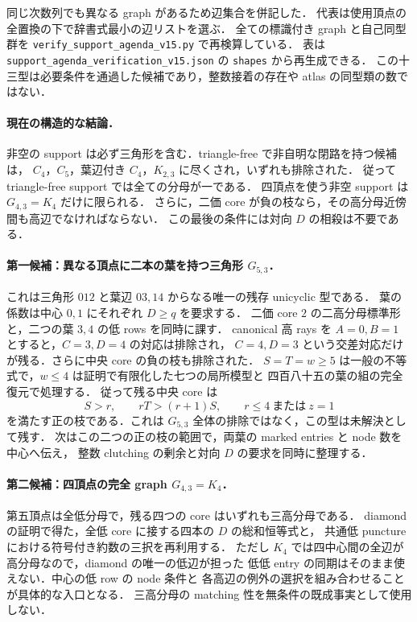 同じ次数列でも異なる graph があるため辺集合を併記した．
代表は使用頂点の全置換の下で辞書式最小の辺リストを選ぶ．
全ての標識付き graph と自己同型群を
\nolinkurl{verify_support_agenda_v15.py} で再検算している．
表は \nolinkurl{support_agenda_verification_v15.json} の \texttt{shapes} から再生成できる．
この十三型は必要条件を通過した候補であり，整数接着の存在や atlas の同型類の数ではない．

\paragraph{現在の構造的な結論．}
非空の support は必ず三角形を含む．triangle-free で非自明な閉路を持つ候補は，
$C_4$，$C_5$，葉辺付き $C_4$，$K_{2,3}$ に尽くされ，いずれも排除された．
従って triangle-free support では全ての分母が一である．
四頂点を使う非空 support は $G_{4,3}=K_4$ だけに限られる．
さらに，二価 core が負の枝なら，その高分母近傍間も高辺でなければならない．
この最後の条件には対向 $D$ の相殺は不要である．

\paragraph{第一候補：異なる頂点に二本の葉を持つ三角形 $G_{5,3}$．}
これは三角形 $012$ と葉辺 $03,14$ からなる唯一の残存 unicyclic 型である．
葉の係数は中心 $0,1$ にそれぞれ $D\geq q$ を要求する．
二価 core $2$ の二高分母標準形と，二つの葉 $3,4$ の低 rows を同時に課す．
canonical 高 rays を $A=0,B=1$ とすると，$C=3,D=4$ の対応は排除され，
$C=4,D=3$ という交差対応だけが残る．さらに中央 core の負の枝も排除された．
$S=T=w\geq5$ は一般の不等式で，$w\leq4$ は証明で有限化した七つの局所模型と
四百八十五の葉の組の完全復元で処理する．
従って残る中央 core は
\[
 S>r,\qquad rT>(r+1)S,\qquad r\leq4\ \text{または}\ z=1
\]
を満たす正の枝である．これは $G_{5,3}$ 全体の排除ではなく，この型は未解決として残す．
次はこの二つの正の枝の範囲で，両葉の marked entries と node 数を中心へ伝え，
整数 clutching の剰余と対向 $D$ の要求を同時に整理する．

\paragraph{第二候補：四頂点の完全 graph $G_{4,3}=K_4$．}
第五頂点は全低分母で，残る四つの core はいずれも三高分母である．
diamond の証明で得た，全低 core に接する四本の $D$ の総和恒等式と，
共通低 puncture における符号付き約数の三択を再利用する．
ただし $K_4$ では四中心間の全辺が高分母なので，diamond の唯一の低辺が担った
低低 entry の同期はそのまま使えない．中心の低 row の node 条件と
各高辺の例外の選択を組み合わせることが具体的な入口となる．
三高分母の matching 性を無条件の既成事実として使用しない．

